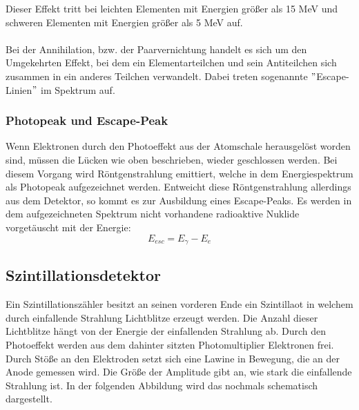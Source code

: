 Dieser Effekt tritt bei leichten Elementen mit Energien größer als 15 MeV und schweren Elementen mit Energien größer als 5 MeV auf.\\
\\
Bei der Annihilation, bzw. der Paarvernichtung handelt es sich um den Umgekehrten Effekt, bei dem ein Elementarteilchen und sein Antiteilchen sich zusammen in ein anderes Teilchen verwandelt. Dabei treten sogenannte $"$Escape-Linien$"$ im Spektrum auf. 

	\subsubsection*{Photopeak und Escape-Peak}
	Wenn Elektronen durch den Photoeffekt aus der Atomschale herausgelöst worden sind, müssen die Lücken wie oben beschrieben, wieder geschlossen werden. Bei diesem Vorgang wird Röntgenstrahlung emittiert, welche in dem Energiespektrum als Photopeak aufgezeichnet werden. Entweicht diese Röntgenstrahlung allerdings aus dem Detektor, so kommt es zur Ausbildung eines Escape-Peaks. Es werden in dem aufgezeichneten Spektrum nicht vorhandene radioaktive Nuklide vorgetäuscht mit der Energie:
	\begin{equation}
	E_{esc} = E_{\gamma} - E_{e}
	\end{equation}

\subsection{Szintillationsdetektor}
Ein Szintillationszähler besitzt an seinen vorderen Ende ein Szintillaot in welchem durch einfallende Strahlung Lichtblitze erzeugt werden. Die Anzahl dieser Lichtblitze hängt von der Energie der einfallenden Strahlung ab. Durch den Photoeffekt werden aus dem dahinter sitzten Photomultiplier Elektronen frei. Durch Stöße an den Elektroden setzt sich eine Lawine in Bewegung, die an der Anode gemessen wird. Die Größe der Amplitude gibt an, wie stark die einfallende Strahlung ist. In der folgenden Abbildung wird das nochmals schematisch dargestellt.

